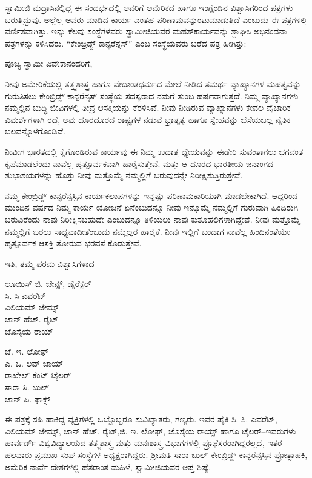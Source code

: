 ಸ್ವಾಮೀಜಿ ಮದ್ರಾಸಿನಲ್ಲಿದ್ದ ಈ ಸಂದರ್ಭದಲ್ಲಿ ಅವರಿಗೆ ಅಮೆರಿಕದ ಹಾಗೂ ಇಂಗ್ಲೆಂಡಿನ ವಿಶ್ವಾಸಿಗರಿಂದ ಪತ್ರಗಳು ಬರುತ್ತಿದ್ದುವು. ಅಲ್ಲೆಲ್ಲ ಅವರು ಮಾಡಿದ ಕಾರ್ಯ ಎಂತಹ ಪರಿಣಾಮವನ್ನುಂಟುಮಾಡುತ್ತಿದೆ ಎಂಬುದು ಈ ಪತ್ರಗಳಲ್ಲಿ ವರ್ಣಿತವಾಗಿತ್ತು. ಇನ್ನು ಕೆಲವು ಸಂಸ್ಥೆಗಳವರು ಸ್ವಾಮೀಜಿಯವರ ಮಹತ್​ಕಾರ್ಯವನ್ನು ಶ್ಲಾಘಿಸಿ ಅಭಿನಂದನಾ ಪತ್ರಗಳನ್ನು ಕಳಿಸಿದರು. “ಕೇಂಬ್ರಿಡ್ಜ್ ಕಾನ್ಫರೆನ್ಸಸ್​” ಎಂಬ ಸಂಸ್ಥೆಯವರು ಬರೆದ ಪತ್ರ ಹೀಗಿತ್ತು:

ಪೂಜ್ಯ ಸ್ವಾಮೀ ವಿವೇಕಾನಂದರಿಗೆ,

ನೀವು ಅಮೇರಿಕೆಯಲ್ಲಿ ತತ್ತ್ವಶಾಸ್ತ್ರ ಹಾಗೂ ವೇದಾಂತಧರ್ಮದ ಮೇಲೆ ನೀಡಿದ ಸಮರ್ಥ ವ್ಯಾಖ್ಯಾನಗಳ ಮಹತ್ವವನ್ನು ಗುರುತಿಸಲು ಕೇಂಬ್ರಿಡ್ಜ್ ಕಾನ್ಫರೆನ್ಸಸ್ ಸಂಸ್ಥೆಯ ಸದಸ್ಯರಾದ ನಮಗೆ ತುಂಬ ಹರ್ಷವಾಗುತ್ತದೆ. ನಿಮ್ಮ ವ್ಯಾಖ್ಯಾನಗಳು ನಮ್ಮಲ್ಲಿನ ಬುದ್ಧಿ ಜೀವಿಗಳಲ್ಲಿ ತೀವ್ರ ಆಸಕ್ತಿಯನ್ನು ಕೆರಳಿಸಿವೆ. ನೀವು ನೀಡಿರುವ ವ್ಯಾಖ್ಯಾನಗಳು ಕೇವಲ ವೈಚಾರಿಕ ವಿಮರ್ಶೆಗಳಾಗಿ ರದೆ, ಅವು ದೂರದೂರದ ರಾಷ್ಟ್ರಗಳ ನಡುವೆ ಭ್ರಾತೃತ್ವ ಹಾಗೂ ಸ್ನೇಹವನ್ನು ಬೆಸೆಯಬಲ್ಲ ನೈತಿಕ ಬಲವನ್ನೊಳಗೊಂಡಿವೆ.

ನೀವೀಗ ಭಾರತದಲ್ಲಿ ಕೈಗೊಂಡಿರುವ ಕಾರ್ಯವು ಈ ನಿಮ್ಮ ಉದಾತ್ತ ಧ್ಯೇಯವನ್ನು ಈಡೇರಿ ಸುವಂತಾಗಲು ಭಗವಂತ ಕೃಪೆಮಾಡಲೆಂದು ನಾವೆಲ್ಲ ಹೃತ್ಪೂರ್ವಕವಾಗಿ ಹಾರೈಸುತ್ತೇವೆ. ಮತ್ತು ಆ ದೂರದ ಭಾರತೀಯ ಜನಾಂಗದ ಶುಭಾಶಯಗಳನ್ನು ಹೊತ್ತು ನೀವು ಮತ್ತೊಮ್ಮೆ ನಮ್ಮಲ್ಲಿಗೆ ಬರುವುದನ್ನೇ ನಿರೀಕ್ಷಿಸುತ್ತಿರುತ್ತೇವೆ.

ನಮ್ಮ ಕೇಂಬ್ರಿಡ್ಜ್ ಕಾನ್ಫರೆನ್ಸಸ್ಸಿನ ಕಾರ್ಯಕಲಾಪಗಳನ್ನು ಇನ್ನಷ್ಟು ಪರಿಣಾಮಕಾರಿಯಾಗಿ ಮಾಡಬೇಕಾಗಿದೆ. ಆದ್ದರಿಂದ ಮುಂದಿನ ವರ್ಷದ ನಿಮ್ಮ ಕಾರ್ಯ ಯೋಜನೆ ಏನೆಂಬುದನ್ನೂ ನೀವು ಇನ್ನೊಮ್ಮೆ ನಮ್ಮಲ್ಲಿಗೆ ಗುರುವಾಗಿ ಹಿಂದಿರುಗಿ ಬರುವಿರೆಂದು ನಾವು ನಿರೀಕ್ಷಿಸಬಹುದೇ ಎಂಬುದನ್ನೂ ತಿಳಿಯಲು ನಾವು ಕುತೂಹಲಿಗಳಾಗಿದ್ದೇವೆ. ನೀವು ಮತ್ತೊಮ್ಮೆ ನಮ್ಮಲ್ಲಿಗೆ ಬರಲು ಸಾಧ್ಯವಾದೀತೆಂಬುದು ನಮ್ಮೆಲ್ಲರ ಹಾರೈಕೆ. ನೀವು ಇಲ್ಲಿಗೆ ಬಂದಾಗ ನಾವೆಲ್ಲ ಹಿಂದಿನಂತೆಯೇ ಹೃತ್ಪೂರ್ವಕ ಆಸಕ್ತಿ ತೋರುವ ಭರವಸೆ ಕೊಡುತ್ತೇವೆ.

\begin{flushright}
ಇತಿ, ತಮ್ಮ ಪರಮ ವಿಶ್ವಾಸಿಗಳಾದ
\end{flushright}

ಲೂಯಿಸ್ ಜಿ. ಜೇನ್ಸ್, ಡೈರೆಕ್ಟರ್\\
 ಸಿ. ಸಿ ಎವರೆಟ್\\
 ವಿಲಿಯಮ್ ಜೇಮ್ಸ್ \\
 ಜಾನ್ ಹೆಚ್. ರೈಟ್\\
 ಜೊಸೈಯ ರಾಯ್

\begin{flushright}
ಜೆ. ಇ. ಲೋಫ್​\\
 ಎ. ಒ. ಲವ್ ಜಾಯ್​\\
 ರಾಖೇಲ್ ಕೆಂಟ್ ಟೈಲರ್​\\
 ಸಾರಾ ಸಿ. ಬುಲ್​\\
 ಜಾನ್ ಪಿ. ಫಾಕ್ಸ್
\end{flushright}

ಈ ಪತ್ರಕ್ಕೆ ಸಹಿ ಹಾಕಿದ್ದ ವ್ಯಕ್ತಿಗಳಲ್ಲಿ ಒಬ್ಬೊಬ್ಬರೂ ಸುವಿಖ್ಯಾತರು, ಗಣ್ಯರು. ಇವರ ಪೈಕಿ ಸಿ. ಸಿ. ಎವರೆಟ್, ವಿಲಿಯಮ್ ಜೇಮ್ಸ್, ಜಾನ್ ಹೆಚ್. ರೈಟ್,ಜಿ. ಇ. ಲೋಫ್, ಜೊಸೈಯ ರಾಯ್ಸ್ ಹಾಗೂ ಟೈಲರ್​–ಇವರುಗಳು ಹಾರ್ವರ್ಡ್ ವಿಶ್ವವಿದ್ಯಾಲಯದ ತತ್ತ್ವಶಾಸ್ತ್ರ ಮತ್ತು ಮನಃಶಾಸ್ತ್ರ ವಿಭಾಗಗಳಲ್ಲಿ ಪ್ರೊಫೆಸರರಾಗಿದ್ದರಲ್ಲದೆ, ಇತರ ಹಲವಾರು ಪ್ರಮುಖ ಸಂಘ ಸಂಸ್ಥೆಗಳ ಅಧ್ಯಕ್ಷರಾಗಿದ್ದರು. ಶ್ರೀಮತಿ ಸಾರಾ ಬುಲ್ ಕೇಂಬ್ರಿಡ್ಜ್ ಕಾನ್ಫರೆನ್ಸಸ್ಸಿನ ಪ್ರೋತ್ಸಾಹಕಿ, ಅಮೆರಿಕ-ನಾರ್ವೆ ದೇಶಗಳಲ್ಲಿ ಹೆಸರಾಂತ ಮಹಿಳೆ, ಸ್ವಾಮೀಜಿಯವರ ಆಪ್ತ ಶಿಷ್ಯೆ.

